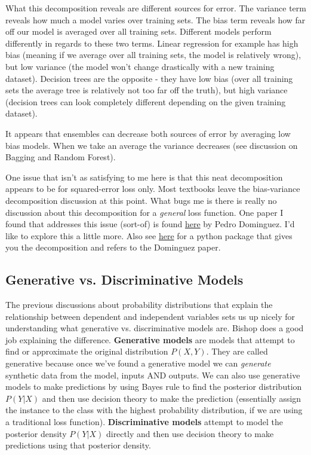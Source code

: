 What this decomposition reveals are different sources for error. The variance term reveals how much a model varies over training sets. The bias term reveals how far off our model is averaged over all training sets. Different models perform differently in regards to these two terms. Linear regression for example has high bias (meaning if we average over all training sets, the model is relatively wrong), but low variance (the model won't change drastically with a new training dataset). Decision trees are the opposite - they have low bias (over all training sets the average tree is relatively not too far off the truth), but high variance (decision trees can look completely different depending on the given training dataset).

It appears that ensembles can decrease both sources of error by averaging low bias models. When we take an average the variance decreases (see discussion on Bagging and Random Forest).

One issue that isn't as satisfying to me here is that this neat decomposition appears to be for squared-error loss only. Most textbooks leave the bias-variance decomposition discussion at this point. What bugs me is there is really no discussion about this decomposition for a \emph{general} loss function. One paper I found that addresses this issue (sort-of) is found \href{https://homes.cs.washington.edu/~pedrod/bvd.pdf}{here} by Pedro Dominguez. I'd like to explore this a little more. Also see \href{https://github.com/rasbt/mlxtend/blob/master/docs/sources/user_guide/evaluate/bias_variance_decomp.ipynb?utm_campaign=Data_Elixir&utm_source=Data_Elixir_210}{here} for a python package that gives you the decomposition and refers to the Dominguez paper.




\subsection{Generative vs. Discriminative Models}

The previous discussions about probability distributions that explain the relationship between dependent and independent variables sets us up nicely for understanding what generative vs. discriminative models are. Bishop does a good job explaining the difference. \textbf{Generative models} are models that attempt to find or approximate the original distribution $P(X,Y)$. They are called generative because once we've found a generative model we can \emph{generate} synthetic data from the model, inputs AND outputs. We can also use generative models to make predictions by using Bayes rule to find the posterior distribution $P(Y|X)$ and then use decision theory to make the prediction (essentially assign the instance to the class with the highest probability distribution, if we are using a traditional loss function). \textbf{Discriminative models} attempt to model the posterior density $P(Y|X)$ directly and then use decision theory to make predictions using that posterior density. 


